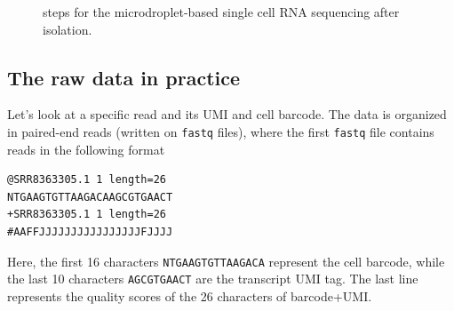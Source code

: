 \documentclass[
  letterpaper,
  DIV=11,
  numbers=noendperiod]{scrartcl}
\begin{document}
\begin{figure}


\caption{\label{fig-steps}steps for the microdroplet-based single cell
RNA sequencing after isolation.}

\end{figure}%

\subsection{The raw data in practice}\label{the-raw-data-in-practice}

Let's look at a specific read and its UMI and cell barcode. The data is
organized in paired-end reads (written on \texttt{fastq} files), where
the first \texttt{fastq} file contains reads in the following format

\begin{verbatim}
@SRR8363305.1 1 length=26
NTGAAGTGTTAAGACAAGCGTGAACT
+SRR8363305.1 1 length=26
#AAFFJJJJJJJJJJJJJJJJFJJJJ
\end{verbatim}

Here, the first 16 characters \texttt{NTGAAGTGTTAAGACA} represent the
cell barcode, while the last 10 characters \texttt{AGCGTGAACT} are the
transcript UMI tag. The last line represents the quality scores of the
26 characters of barcode+UMI.
\end{document}

